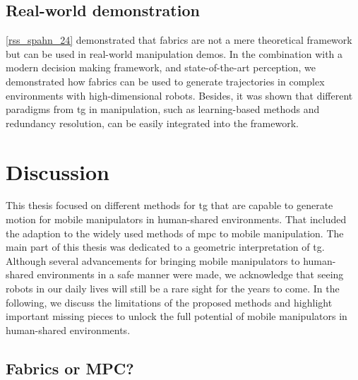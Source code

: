 \subsection{Real-world demonstration}
\label{sec:conclusion_real_world}

\cref{rss_spahn_24} demonstrated that \ac{fabrics} are not a mere theoretical
framework but can be used in real-world manipulation demos. In the combination
with a modern decision making framework, and state-of-the-art perception, 
we demonstrated how \ac{fabrics} can be used to generate trajectories in complex
environments with high-dimensional robots. Besides, it was shown that different
paradigms from \ac{tg} in manipulation, such as learning-based methods and
redundancy resolution, can be easily integrated into the framework.


\section{Discussion}
\label{sec:discussion}

This thesis focused on different methods for \ac{tg} that are capable to
generate motion for mobile manipulators in human-shared environments. That
included the adaption to the widely used methods of \ac{mpc} to mobile
manipulation. The main part of this thesis was dedicated to a geometric
interpretation of \ac{tg}. Although several advancements for bringing mobile
manipulators to human-shared environments in a safe manner were made, we acknowledge
that seeing robots in our daily lives will still be a rare sight for the years
to come. In the following, we discuss the limitations of the proposed methods
and highlight important missing pieces to unlock the full potential of mobile
manipulators in human-shared environments.

\subsection{Fabrics or MPC?}
\label{sec:discussion_fabrics_or_mpc}

